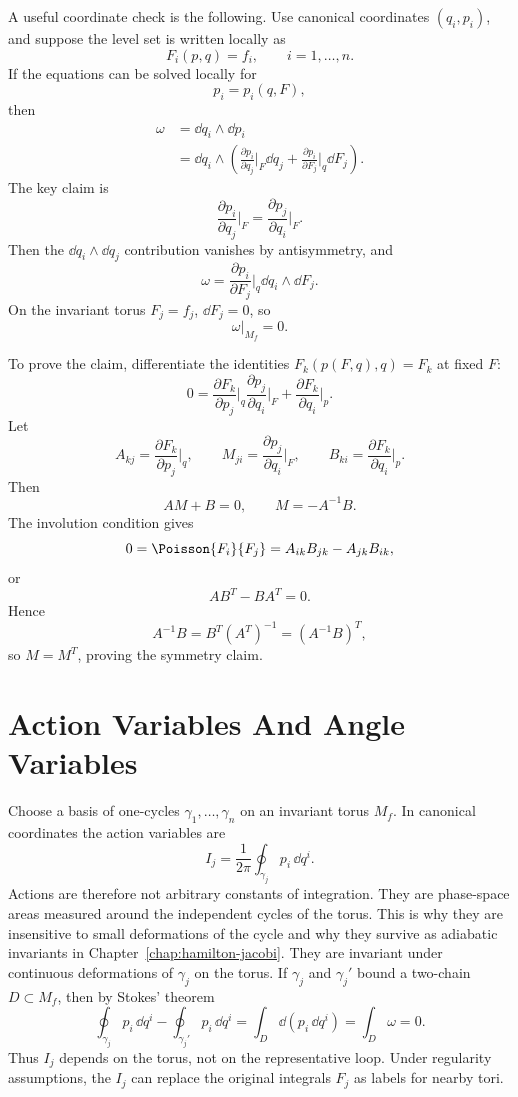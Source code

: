 \begin{derivation}
A useful coordinate check is the following. Use canonical
coordinates \((q_i,p_i)\), and suppose the level set is written locally as
\[
  F_i(p,q)=f_i,\qquad i=1,\ldots,n.
\]
If the equations can be solved locally for
\[
  p_i=p_i(q,F),
\]
then
\[
\begin{aligned}
  \omega
  &=
  \dd q_i\wedge\dd p_i\\
  &=
  \dd q_i\wedge
  \left(
    \frac{\partial p_i}{\partial q_j}\bigg|_F\dd q_j
    +
    \frac{\partial p_i}{\partial F_j}\bigg|_q\dd F_j
  \right).
\end{aligned}
\]
The key claim is
\[
  \frac{\partial p_i}{\partial q_j}\bigg|_F
  =
  \frac{\partial p_j}{\partial q_i}\bigg|_F.
\]
Then the \(\dd q_i\wedge\dd q_j\) contribution vanishes by antisymmetry, and
\[
  \omega=
  \frac{\partial p_i}{\partial F_j}\bigg|_q\dd q_i\wedge\dd F_j.
\]
On the invariant torus \(F_j=f_j\), \(\dd F_j=0\), so
\[
  \omega|_{M_f}=0.
\]

To prove the claim, differentiate the identities \(F_k(p(F,q),q)=F_k\) at
fixed \(F\):
\[
  0=
  \frac{\partial F_k}{\partial p_j}\bigg|_q
  \frac{\partial p_j}{\partial q_i}\bigg|_F
  +
  \frac{\partial F_k}{\partial q_i}\bigg|_p.
\]
Let
\[
  A_{kj}=\frac{\partial F_k}{\partial p_j}\bigg|_q,\qquad
  M_{ji}=\frac{\partial p_j}{\partial q_i}\bigg|_F,\qquad
  B_{ki}=\frac{\partial F_k}{\partial q_i}\bigg|_p.
\]
Then
\[
  AM+B=0,\qquad M=-A^{-1}B.
\]
The involution condition gives
\[
  0=\Poisson{F_i}{F_j}
  =
  A_{ik}B_{jk}-A_{jk}B_{ik},
\]
or
\[
  AB^T-BA^T=0.
\]
Hence
\[
  A^{-1}B=B^T(A^T)^{-1}=(A^{-1}B)^T,
\]
so \(M=M^T\), proving the symmetry claim.
\end{derivation}

\section{Action Variables And Angle Variables}
\label{sec:action-angle-variables}

Choose a basis of one-cycles \(\gamma_1,\ldots,\gamma_n\) on an invariant torus
\(M_f\). In canonical coordinates the action variables are
\[
  I_j=\frac{1}{2\pi}\oint_{\gamma_j} p_i\,\dd q^i.
\]
Actions are therefore not arbitrary constants of integration. They are
phase-space areas measured around the independent cycles of the torus. This is
why they are insensitive to small deformations of the cycle and why they
survive as adiabatic invariants in Chapter~\ref{chap:hamilton-jacobi}.
They are invariant under continuous deformations of \(\gamma_j\) on the torus.
If \(\gamma_j\) and \(\gamma_j'\) bound a two-chain \(D\subset M_f\), then by
Stokes' theorem
\[
  \oint_{\gamma_j}p_i\,\dd q^i
  -
  \oint_{\gamma_j'}p_i\,\dd q^i
  =
  \int_D \dd(p_i\,\dd q^i)
  =
  \int_D \omega
  =
  0.
\]
Thus \(I_j\) depends on the torus, not on the representative loop. Under
regularity assumptions, the \(I_j\) can replace the original integrals \(F_j\)
as labels for nearby tori.

